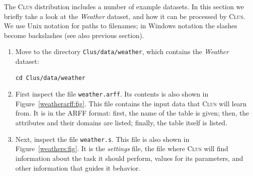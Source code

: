 \documentclass[a4paper]{report}
\newcommand{\clus}{\textsc{Clus}}
\begin{document}
The \clus{} distribution includes a number of example datasets.  In this section we briefly take a look at the {\em Weather} dataset, and how it can be processed by \clus{}.  We use Unix notation for paths to filenames; in Windows notation the slashes become backslashes (see also previous section).
\begin{enumerate}
  \item Move to the directory {\tt Clus/data/weather}, which contains the {\em Weather} dataset:
\begin{verbatim}
cd Clus/data/weather
\end{verbatim}

  \item First inspect the file {\tt weather.arff}.  Its contents is also shown in Figure~\ref{weatherarff:fig}.
This file contains the input data that \clus{} will learn from.  It is in the ARFF format: first, the name of the table is given; then, the attributes and their domains are listed; finally, the table itself is listed.

  \item Next, inspect the file {\tt weather.s}.  This file is also shown in Figure~\ref{weathers:fig}.  
It is the {\em settings} file, the file where \clus{} will find information about the task it should perform, values for its parameters, and other information that guides it behavior.



\end{enumerate}
\end{document}

